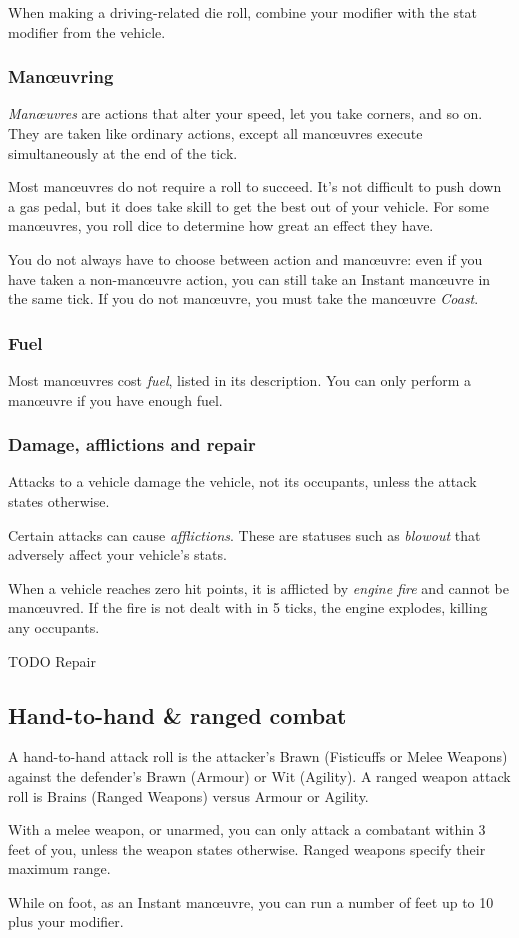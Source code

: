 \documentclass[10pt, a4paper, twocolumn]{article}
\begin{document}
When making a driving-related die roll, combine your 
modifier with the stat modifier from the vehicle.

\subsubsection{Man\oe{}uvring}
\emph{Man\oe{}uvres} are actions that alter your speed, let you take corners,
and so on. They are taken like ordinary actions, except all man\oe{}uvres
execute simultaneously at the end of the tick. 

Most man\oe{}uvres do not require a roll to succeed. It's not difficult to push
down a gas pedal, but it does take skill to get the best out of your vehicle.
For some man\oe{}uvres, you roll dice to determine how great an effect they
have.

You do not always have to choose between action and man\oe{}uvre: even if you
have taken a non-man\oe{}uvre action, you can still take an Instant man\oe{}uvre
in the same tick. If you do not man\oe{}uvre, you must take the man\oe{}uvre
\emph{Coast}.

\subsubsection{Fuel}
Most man\oe{}uvres cost \emph{fuel}, listed in its description. You can only
perform a man\oe{}uvre if you have enough fuel.

\subsubsection{Damage, afflictions and repair}
Attacks to a vehicle damage the vehicle, not its occupants, unless the attack
states otherwise.

Certain attacks can cause \emph{afflictions}. These are statuses such as
\emph{blowout} that adversely affect your vehicle's stats.

When a vehicle reaches zero hit points, it is afflicted by \emph{engine fire}
and cannot be man\oe{}uvred. If the fire is not dealt with in 5 ticks, the
engine explodes, killing any occupants.

TODO Repair

\subsection{Hand-to-hand \& ranged combat}
A hand-to-hand attack roll is the attacker's Brawn (Fisticuffs or Melee Weapons)
against the defender's Brawn (Armour) or Wit (Agility). A ranged weapon attack
roll is Brains (Ranged Weapons) versus Armour or Agility. 

With a melee weapon, or unarmed, you can only attack a combatant within 3 feet
of you, unless the weapon states otherwise. Ranged weapons specify their maximum
range. 

While on foot, as an Instant man\oe{}uvre, you can run a number of feet up to 10
plus your  modifier.
\end{document}
